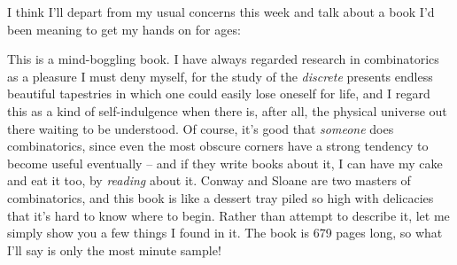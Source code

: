 
I think I'll depart from my usual concerns this week and talk about a book I'd been meaning to get my hands on for ages:


This is a mind-boggling book. I have always regarded research in combinatorics as a pleasure I must deny myself, for the study of the \emph{discrete} presents endless beautiful tapestries in which one could easily lose oneself for life, and I regard this as a kind of self-indulgence when there is, after all, the physical universe out there waiting to be understood. Of course, it's good that \emph{someone} does combinatorics, since even the most obscure corners have a strong tendency to become useful eventually -- and if they write books about it, I can have my cake and eat it too, by \emph{reading} about it. Conway and Sloane are two masters of combinatorics, and this book is like a dessert tray piled so high with delicacies that it's hard to know where to begin. Rather than attempt to describe it, let me simply show you a few things I found in it. The book is 679 pages long, so what I'll say is only the most minute sample!

